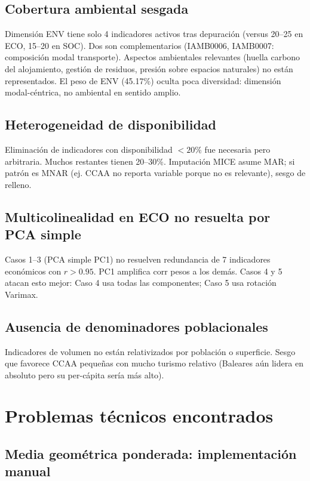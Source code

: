 \subsection{Cobertura ambiental sesgada}

Dimensión ENV tiene solo 4 indicadores activos tras depuración (versus 20--25 en ECO, 15--20 en SOC). Dos son complementarios (IAMB0006, IAMB0007: composición modal transporte). Aspectos ambientales relevantes (huella carbono del alojamiento, gestión de residuos, presión sobre espacios naturales) no están representados. El peso de ENV (45.17\%) oculta poca diversidad: dimensión modal-céntrica, no ambiental en sentido amplio.

\subsection{Heterogeneidad de disponibilidad}

Eliminación de indicadores con disponibilidad $< 20\%$ fue necesaria pero arbitraria. Muchos restantes tienen 20--30\%. Imputación MICE asume MAR; si patrón es MNAR (ej. CCAA no reporta variable porque no es relevante), sesgo de relleno.

\subsection{Multicolinealidad en ECO no resuelta por PCA simple}

Casos 1--3 (PCA simple PC1) no resuelven redundancia de 7 indicadores económicos con $r > 0.95$. PC1 amplifica corr pesos a los demás. Casos 4 y 5 atacan esto mejor: Caso 4 usa todas las componentes; Caso 5 usa rotación Varimax.

\subsection{Ausencia de denominadores poblacionales}

Indicadores de volumen no están relativizados por población o superficie. Sesgo que favorece CCAA pequeñas con mucho turismo relativo (Baleares aún lidera en absoluto pero su per-cápita sería más alto).

\section{Problemas técnicos encontrados}

\subsection{Media geométrica ponderada: implementación manual}

